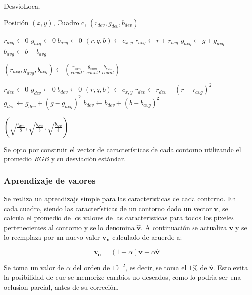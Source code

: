 \begin{algorithm}[H]
    \caption{DesvioLocal}
    \label{alg:desvio-local}
    \begin{algorithmic}
    \Require\hspace{\algorithmicindent}\hspace{\algorithmicindent}Posición $(x, y)$, Cuadro c, 
    \Ensure\hspace{\algorithmicindent}\hspace{0.23cm} $(r_{dev}, g_{dev}, b_{dev})$
    \State

    \State $r_{avg} \gets 0$
    \State $g_{avg} \gets 0$
    \State $b_{avg} \gets 0$
        \State $(r, g, b) \gets c_{x, y}$
        \State $r_{avg} \gets r + r_{avg}$
        \State $g_{avg} \gets g + g_{avg}$
        \State $b_{avg} \gets b + b_{avg}$
    \EndFor

    \State $(r_{avg}, g_{avg}, b_{avg}) \gets (\frac{r_{sum}}{count}, \frac{g_{sum}}{count}, \frac{b_{sum}}{count}) $

    \State $r_{dev} \gets 0$
    \State $g_{dev} \gets 0$
    \State $b_{dev} \gets 0$
        \State $(r, g, b) \gets c_{x, y}$
        \State $r_{dev} \gets r_{dev} + (r - r_{avg})^2$
        \State $g_{dev} \gets g_{dev} + (g - g_{avg})^2$
        \State $b_{dev} \gets b_{dev} + (b - b_{avg})^2$
    \EndFor

    \State \Return $ (\sqrt{\frac{r_{dev}}{8}}, \sqrt{\frac{g_{dev}}{8}}, \sqrt{\frac{b_{dev}}{8}}) $

    \end{algorithmic}
\end{algorithm}

Se opto por construir el vector de características de cada contorno utilizando
el promedio \textit{RGB} y su desviación estándar.

\subsubsection{Aprendizaje de valores}

Se realiza un aprendizaje simple para las características de cada contorno. En
cada cuadro, siendo las características de un contorno dado un vector
$\mathbf{v}$, se calcula el promedio de los valores de las características para
todos los píxeles pertenecientes al contorno y se lo denomina
$\hat{\mathbf{v}}$. A continuación se actualiza $\mathbf{v}$ y se lo reemplaza
por un nuevo valor $\mathbf{v_n}$ calculado de acuerdo a:

\[
  \mathbf{v_n} = \left(1-\alpha\right)\mathbf{v} + \alpha \hat{\mathbf{v}}
\]

Se toma un valor de $\alpha$ del orden de $10^{-2}$, es decir, se toma el $1\%$
de $\hat{\mathbf{v}}$. Esto evita la posibilidad de que se memorize cambios
no deseados, como lo podria ser una oclusion parcial, antes de su correción.


